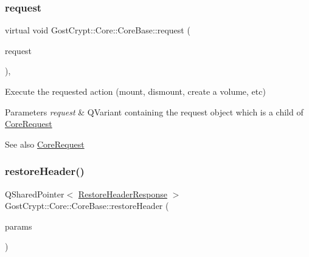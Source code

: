 \subsubsection{\texorpdfstring{request}{request}}
{\footnotesize\ttfamily virtual void Gost\+Crypt\+::\+Core\+::\+Core\+Base\+::request (\begin{DoxyParamCaption}\item[{Q\+Variant}]{request }\end{DoxyParamCaption})\hspace{0.3cm}{\ttfamily [pure virtual]}, {\ttfamily [slot]}}



Execute the requested action (mount, dismount, create a volume, etc) 


\begin{DoxyParams}{Parameters}
{\em request} & Q\+Variant containing the request object which is a child of \hyperlink{struct_gost_crypt_1_1_core_1_1_core_request}{Core\+Request} \\
\hline
\end{DoxyParams}
\begin{DoxySeeAlso}{See also}
\hyperlink{struct_gost_crypt_1_1_core_1_1_core_request}{Core\+Request} 
\end{DoxySeeAlso}
\mbox{\label{class_gost_crypt_1_1_core_1_1_core_base_a206b9b51031f6389b95e568cd4bf9828}} 
\subsubsection{\texorpdfstring{restore\+Header()}{restoreHeader()}}
{\footnotesize\ttfamily Q\+Shared\+Pointer$<$ \hyperlink{struct_gost_crypt_1_1_core_1_1_restore_header_response}{Restore\+Header\+Response} $>$ Gost\+Crypt\+::\+Core\+::\+Core\+Base\+::restore\+Header (\begin{DoxyParamCaption}\item[{Q\+Shared\+Pointer$<$ \hyperlink{struct_gost_crypt_1_1_core_1_1_restore_header_request}{Restore\+Header\+Request} $>$}]{params }\end{DoxyParamCaption})\hspace{0.3cm}{\ttfamily [protected]}}



